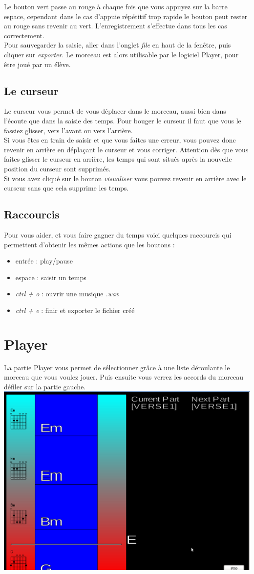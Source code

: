 \documentclass[a4paper]{article}
\begin{document}
Le bouton vert passe au rouge à chaque fois que vous appuyez sur la barre espace, cependant dans le cas d'appuie répétitif trop rapide le bouton peut rester au rouge sans revenir au vert. 
L'enregistrement s'effectue dans tous les cas correctement. \\

Pour sauvegarder la saisie, aller dans l'onglet \textit{file} en haut de la fenêtre, puis cliquer sur \textit{exporter}. 
Le morceau est alors utilisable par le logiciel Player, pour être joué par un élève.
\subsection{Le curseur}  
Le curseur vous permet de vous déplacer dans le morceau, aussi bien dans l'écoute que dans la saisie des temps. 
Pour bouger le curseur il faut que vous le fassiez glisser, vers l'avant ou vers l'arrière.\\
Si vous êtes en train de saisir et que vous faites une erreur, vous pouvez donc revenir en arrière en déplaçant le curseur et vous corriger. 
Attention dès que vous faites glisser le curseur en arrière, les temps qui sont situés après la nouvelle position du curseur sont supprimés.\\
Si vous avez cliqué sur le bouton \textit{visualiser} vous pouvez revenir en arrière avec le curseur sans que cela supprime les temps.
\subsection{Raccourcis} 
Pour vous aider, et vous faire gagner du temps voici quelques raccourcis qui permettent d'obtenir les mêmes actions que les boutons : 
\begin{itemize}
\item  entrée : play/pause
\item  espace : saisir un temps
\item  \textit{ctrl + o} : ouvrir une musique \textit{.wav} 
\item  \textit{ctrl + e} : finir et exporter le fichier créé
\end{itemize}
\newpage 
\section {Player} 
La partie Player vous permet de sélectionner grâce à une liste déroulante le morceau que vous voulez jouer. 
Puis ensuite vous verrez les accords du morceau défiler sur la partie gauche.\\
\includegraphics[scale=0.5]{manulutil10.png}\\
\end{document}
